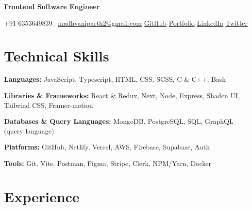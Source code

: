 \documentclass[11pt,a4paper,sans]{moderncv}
\begin{document}
\makecvtitle
\vspace*{-16mm}
\begin{center}\textbf{ Frontend Software Engineer }\end{center}

\begin{center}
{+91-6353649839}~ \quad \href{mailto:madhvaniparth2@gmail.com}{madhvaniparth2@gmail.com} \quad
\href{https://github.com/ParthMadhvani2}{\color{blue}GitHub} \quad
\href{https://parthmadhvani2.vercel.app/}{\color{blue}Portfolio}  \quad
\href{https://www.linkedin.com/in/parthmadhvani2/}{\color{blue}LinkedIn} \quad
\href{https://twitter.com/parthmadhvani2}{\color{blue}Twitter}
\end{center}



\section{Technical Skills}
\begin{itemize}[leftmargin=0in, label={}]
\normalsize{
    \item \textbf{Languages:} JavaScript, Typescript, HTML, CSS, SCSS, C \& C++, Bash
    \item \textbf{Libraries \& Frameworks:} React \& Redux, Next, Node, Express, Shadcn UI, Tailwind CSS, Framer-motion
    \item \textbf{Databases \& Query Languages:} MongoDB, PostgreSQL, SQL, GraphQL (query language)
    \item \textbf{Platforms:} GitHub, Netlify, Vercel, AWS, Firebase, Supabase, Auth
    \item \textbf{Tools:} Git, Vite, Postman, Figma, Stripe, Clerk, NPM/Yarn, Docker
}
\end{itemize}

\section{Experience}
\end{document}
